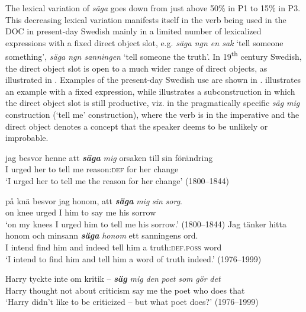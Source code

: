 \documentclass[output=paper]{langscibook}
\begin{document}
The lexical variation of \textit{säga} goes down from just above 50\% in P1 to 15\% in P3. This decreasing lexical variation manifests itself in the verb being used in the DOC in present-day Swedish mainly in a limited number of lexicalized expressions with a fixed direct object slot, e.g. \textit{säga ngn en sak} ‘tell someone something’, \textit{säga ngn sanningen} ‘tell someone the truth’. In 19\textsuperscript{th} century Swedish, the direct object slot is open to a much wider range of direct objects, as illustrated in . Examples of the present-day Swedish use are shown in .  illustrates an example with a fixed expression, while  illustrates a subconstruction in which the direct object slot is still productive, viz. in the pragmatically specific \textit{säg mig} construction (‘tell me’ construction), where the verb is in the imperative and the direct object denotes a concept that the speaker deems to be unlikely or improbable.


\ea \label{ex:valdeson:14}
\ea
\gll jag besvor   henne  att \textbf{\textit{säga}} \textit{mig} orsaken    till     sin  förändring \\
      I      urged     her       to     tell   me  reason:\textsc{def} for     her     change\\
\glt  ‘I urged her to tell me the reason for her change’ (1800–1844)

\ex
\gll på    knä  besvor  jag  honom,  att \textbf{\textit{säga}} \textit{mig}   \textit{sin}   \textit{sorg}.\\
      on    knee   urged   I       him     to     say   me   his   sorrow\\
     \glt ‘on my knees I urged him to tell me his sorrow.’ (1800–1844)
\z
\ex \label{ex:valdeson:15}
\ea \label{ex:valdeson:15a}\gll Jag tänker hitta    honom    och  minsann \textbf{\textit{säga}} \textit{honom} ett    sanningens    ord.\\
      I      intend    find    him      and    indeed    tell      him a       truth:\textsc{def.poss}  word\\
\glt ‘I intend to find him and tell him a word of truth indeed.’ (1976–1999)

\ex \label{ex:valdeson:15b}\gll Harry  tyckte     inte  om    kritik  –  \textbf{\textit{säg}} \textit{mig}  \textit{den}  \textit{poet}  \textit{som}  \textit{gör}  \textit{det}  \\
        Harry    thought    not    about    criticism {} say   me    the    poet    who    does  that\\
\glt ‘Harry didn’t like to be criticized – but what poet does?’ (1976–1999)
\z
\z
\end{document}
